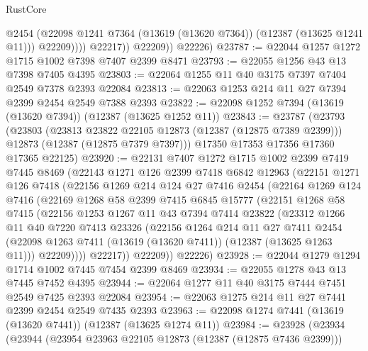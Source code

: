 \begin{lexlean}{RustCore}
\begin{coremodule}
                      @2454
                      (@22098 @1241 @7364 (@13619 (@13620 @7364)) (@12387 (@13625 @1241 @11)))
                      @22209))))
              @22217))
          @22209))
      @22226)
@23787 := @22044 @1257 @1272 @1715 @1002 @7398 @7407 @2399 @8471
@23793 := @22055 @1256 @43 @13 @7398 @7405 @4395
@23803 := @22064 @1255 @11 @40 @3175 @7397 @7404 @2549 @7378 @2393 @22084
@23813 := @22063 @1253 @214 @11 @27 @7394 @2399 @2454 @2549 @7388 @2393
@23822 := @22098 @1252 @7394 (@13619 (@13620 @7394)) (@12387 (@13625 @1252 @11))
@23843 := @23787
    (@23793
      (@23803
        (@23813 @23822 @22105 @12873 (@12387 (@12875 @7389 @2399)))
        @12873
        (@12387 (@12875 @7379 @7397)))
      @17350
      @17353
      @17356
      @17360
      @17365
      @22125)
@23920 := @22131
    @7407
    @1272
    @1715
    @1002
    @2399
    @7419
    @7445
    @8469
    (@22143
      @1271
      @126
      @2399
      @7418
      @6842
      @12963
      (@22151
        @1271
        @126
        @7418
        (@22156
          @1269
          @214
          @124
          @27
          @7416
          @2454
          (@22164
            @1269
            @124
            @7416
            (@22169
              @1268
              @58
              @2399
              @7415
              @6845
              @15777
              (@22151
                @1268
                @58
                @7415
                (@22156
                  @1253
                  @1267
                  @11
                  @43
                  @7394
                  @7414
                  @23822
                  (@23312
                    @1266
                    @11
                    @40
                    @7220
                    @7413
                    @23326
                    (@22156
                      @1264
                      @214
                      @11
                      @27
                      @7411
                      @2454
                      (@22098 @1263 @7411 (@13619 (@13620 @7411)) (@12387 (@13625 @1263 @11)))
                      @22209))))
              @22217))
          @22209))
      @22226)
@23928 := @22044 @1279 @1294 @1714 @1002 @7445 @7454 @2399 @8469
@23934 := @22055 @1278 @43 @13 @7445 @7452 @4395
@23944 := @22064 @1277 @11 @40 @3175 @7444 @7451 @2549 @7425 @2393 @22084
@23954 := @22063 @1275 @214 @11 @27 @7441 @2399 @2454 @2549 @7435 @2393
@23963 := @22098 @1274 @7441 (@13619 (@13620 @7441)) (@12387 (@13625 @1274 @11))
@23984 := @23928
    (@23934
      (@23944
        (@23954 @23963 @22105 @12873 (@12387 (@12875 @7436 @2399)))

\end{coremodule}
\end{lexlean}
